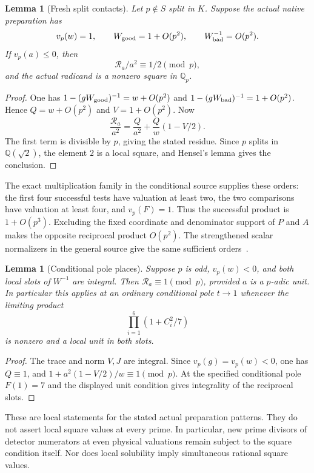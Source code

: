 \documentclass[11pt,a4paper]{article}
\newtheorem{lemma}[theorem]{Lemma}
\newcommand{\Q}{\mathbb Q}\newcommand{\Z}{\mathbb Z}
\begin{document}
\begin{lemma}[Fresh split contacts]\label{lem:contacts}
Let $p\notin S$ split in $K$. Suppose the actual native preparation
has
\[
 v_p(w)=1,\qquad W_{\rm good}=1+O(p^2),\qquad
                         W_{\rm bad}^{-1}=O(p^2).
\]
If $v_p(a)\le0$, then
\[
                         \mathcal R_a/a^2\equiv1/2\pmod p,
\]
and the actual radicand is a nonzero square in $\Q_p$.
\end{lemma}
\begin{proof}
One has $1-(gW_{\rm good})^{-1}=w+O(p^2)$ and
$1-(gW_{\rm bad})^{-1}=1+O(p^2)$. Hence
$Q=w+O(p^2)$ and $V=1+O(p^2)$. Now
\[
 \frac{\mathcal R_a}{a^2}
        =\frac Q{a^2}+\frac Qw(1-V/2).
\]
The first term is divisible by $p$, giving the stated residue.
Since $p$ splits in
$\Q(\sqrt2)$, the element $2$ is a local square, and Hensel's
lemma gives the conclusion.
\end{proof}

The exact multiplication family in the conditional source supplies
these orders: the first four successful tests have valuation at least
two, the two comparisons have valuation at least four, and $v_p(F)=1$.
Thus the successful product is $1+O(p^3)$. Excluding the fixed
coordinate and denominator support of $P$ and $A$ makes the opposite
reciprocal product $O(p^2)$. The strengthened scalar normalizers in
the general source give the same sufficient orders~\cite{Normalized}.

\begin{lemma}[Conditional pole places]\label{lem:poles}
Suppose $p$ is odd, $v_p(w)<0$, and both local slots of $W^{-1}$ are
integral. Then $\mathcal R_a\equiv1\pmod p$, provided $a$ is a
$p$-adic unit. In particular this applies at an ordinary conditional
pole $t\to1$ whenever the limiting product
\[
                     \prod_{i=1}^6(1+C_i^2/7)
\]
is nonzero and a local unit in both slots.
\end{lemma}
\begin{proof}
The trace and norm $V,J$ are integral. Since $v_p(g)=v_p(w)<0$,
one has $Q\equiv1$, and $1+a^2(1-V/2)/w\equiv1\pmod p$.
At the specified conditional pole $F(1)=7$ and the displayed unit
condition gives integrality of the reciprocal slots.
\end{proof}

These are local statements for the stated actual preparation patterns.
They do not assert local square values at every prime. In particular,
new prime divisors of detector numerators at even physical valuations
remain subject to the square condition itself. Nor does local
solubility imply simultaneous rational square values.
\end{document}
